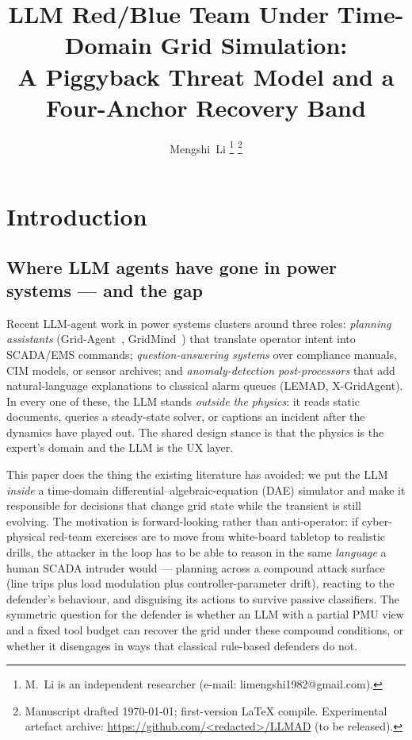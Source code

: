 \documentclass[journal,twocolumn,10pt]{IEEEtran}
\title{LLM Red/Blue Team Under Time-Domain Grid Simulation:\\
       A Piggyback Threat Model and a Four-Anchor Recovery Band}
\author{
  Mengshi~Li
  \thanks{M.~Li is an independent researcher
    (e-mail: limengshi1982@gmail.com).}
  \thanks{Manuscript drafted \today{}; first-version LaTeX compile.
    Experimental artefact archive: \url{https://github.com/<redacted>/LLMAD} (to be released).}
}
\begin{document}
\maketitle
\IEEEdisplaynontitleabstractindextext
\IEEEpeerreviewmaketitle

\section{Introduction}
\label{sec:intro}

\subsection{Where LLM agents have gone in power systems --- and the gap}
Recent LLM-agent work in power systems clusters around three roles: \emph{planning assistants} (Grid-Agent~\cite{grid-agent}, GridMind~\cite{gridmind}) that translate operator intent into SCADA/EMS commands; \emph{question-answering systems} over compliance manuals, CIM models, or sensor archives; and \emph{anomaly-detection post-processors} that add natural-language explanations to classical alarm queues (LEMAD, X-GridAgent). In every one of these, the LLM stands \emph{outside the physics}: it reads static documents, queries a steady-state solver, or captions an incident after the dynamics have played out. The shared design stance is that the physics is the expert's domain and the LLM is the UX layer.

This paper does the thing the existing literature has avoided: we put the LLM \emph{inside} a time-domain differential--algebraic-equation (DAE) simulator and make it responsible for decisions that change grid state while the transient is still evolving. The motivation is forward-looking rather than anti-operator: if cyber-physical red-team exercises are to move from white-board tabletop to realistic drills, the attacker in the loop has to be able to reason in the same \emph{language} a human SCADA intruder would --- planning across a compound attack surface (line trips plus load modulation plus controller-parameter drift), reacting to the defender's behaviour, and disguising its actions to survive passive classifiers. The symmetric question for the defender is whether an LLM with a partial PMU view and a fixed tool budget can recover the grid under these compound conditions, or whether it disengages in ways that classical rule-based defenders do not.
\end{document}
